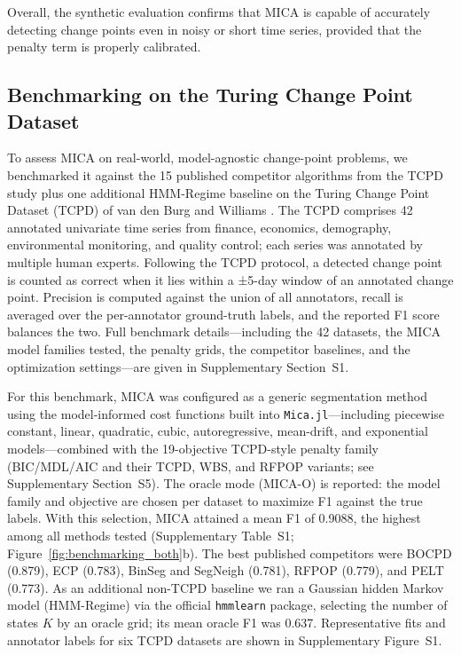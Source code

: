 \documentclass[10pt,letterpaper]{article}
\begin{document}
Overall, the synthetic evaluation confirms that MICA is capable of accurately detecting change points even in noisy or short time series, provided that the penalty term is properly calibrated.

\subsection*{Benchmarking on the Turing Change Point Dataset}

To assess MICA on real-world, model-agnostic change-point problems, we benchmarked it against the 15 published competitor algorithms from the TCPD study plus one additional HMM-Regime baseline on the Turing Change Point Dataset (TCPD) of van den Burg and Williams \cite{vandenburg2020evaluation}. The TCPD comprises 42 annotated univariate time series from finance, economics, demography, environmental monitoring, and quality control; each series was annotated by multiple human experts. Following the TCPD protocol, a detected change point is counted as correct when it lies within a ±5-day window of an annotated change point. Precision is computed against the union of all annotators, recall is averaged over the per-annotator ground-truth labels, and the reported F1 score balances the two. Full benchmark details---including the 42 datasets, the MICA model families tested, the penalty grids, the competitor baselines, and the optimization settings---are given in Supplementary Section~S1.

For this benchmark, MICA was configured as a generic segmentation method using the model-informed cost functions built into \texttt{Mica.jl}---including piecewise constant, linear, quadratic, cubic, autoregressive, mean-drift, and exponential models---combined with the 19-objective TCPD-style penalty family (BIC/MDL/AIC and their TCPD, WBS, and RFPOP variants; see Supplementary Section~S5). The oracle mode (MICA-O) is reported: the model family and objective are chosen per dataset to maximize F1 against the true labels. With this selection, MICA attained a mean F1 of 0.9088, the highest among all methods tested (Supplementary Table~S1; Figure~\ref{fig:benchmarking_both}b). The best published competitors were BOCPD (0.879), ECP (0.783), BinSeg and SegNeigh (0.781), RFPOP (0.779), and PELT (0.773). As an additional non-TCPD baseline we ran a Gaussian hidden Markov model (HMM-Regime) via the official \texttt{hmmlearn} package, selecting the number of states $K$ by an oracle grid; its mean oracle F1 was 0.637. Representative fits and annotator labels for six TCPD datasets are shown in Supplementary Figure~S1.
\end{document}
